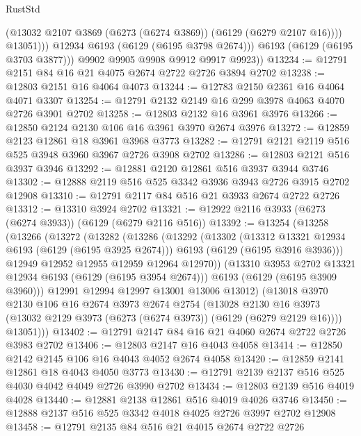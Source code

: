 \begin{lexlean}{RustStd}
\begin{coremodule}
                    (@13032 @2107 @3869 (@6273 (@6274 @3869)) (@6129 (@6279 @2107 @16))))
                  @13051)))
            @12934
            @6193
            (@6129 (@6195 @3798 @2674)))
          @6193
          (@6129 (@6195 @3703 @3877)))
        @9902
        @9905
        @9908
        @9912
        @9917
        @9923))
@13234 := @12791 @2151 @84 @16 @21 @4075 @2674 @2722 @2726 @3894 @2702
@13238 := @12803 @2151 @16 @4064 @4073
@13244 := @12783 @2150 @2361 @16 @4064 @4071 @3307
@13254 := @12791 @2132 @2149 @16 @299 @3978 @4063 @4070 @2726 @3901 @2702
@13258 := @12803 @2132 @16 @3961 @3976
@13266 := @12850 @2124 @2130 @106 @16 @3961 @3970 @2674 @3976
@13272 := @12859 @2123 @12861 @18 @3961 @3968 @3773
@13282 := @12791 @2121 @2119 @516 @525 @3948 @3960 @3967 @2726 @3908 @2702
@13286 := @12803 @2121 @516 @3937 @3946
@13292 := @12881 @2120 @12861 @516 @3937 @3944 @3746
@13302 := @12888 @2119 @516 @525 @3342 @3936 @3943 @2726 @3915 @2702 @12908
@13310 := @12791 @2117 @84 @516 @21 @3933 @2674 @2722 @2726
@13312 := @13310 @3924 @2702
@13321 := @12922 @2116 @3933 (@6273 (@6274 @3933)) (@6129 (@6279 @2116 @516))
@13392 := @13254
    (@13258
      (@13266
        (@13272
          (@13282
            (@13286
              (@13292
                (@13302
                  (@13312 @13321 @12934 @6193 (@6129 (@6195 @3925 @2674)))
                  @6193
                  (@6129 (@6195 @3916 @3936)))
                @12949
                @12952
                @12955
                @12959
                @12964
                @12970))
            (@13310 @3953 @2702 @13321 @12934 @6193 (@6129 (@6195 @3954 @2674)))
            @6193
            (@6129 (@6195 @3909 @3960)))
          @12991
          @12994
          @12997
          @13001
          @13006
          @13012)
        (@13018
          @3970
          @2130
          @106
          @16
          @2674
          @3973
          @2674
          @2754
          (@13028
            @2130
            @16
            @3973
            (@13032 @2129 @3973 (@6273 (@6274 @3973)) (@6129 (@6279 @2129 @16))))
          @13051)))
@13402 := @12791 @2147 @84 @16 @21 @4060 @2674 @2722 @2726 @3983 @2702
@13406 := @12803 @2147 @16 @4043 @4058
@13414 := @12850 @2142 @2145 @106 @16 @4043 @4052 @2674 @4058
@13420 := @12859 @2141 @12861 @18 @4043 @4050 @3773
@13430 := @12791 @2139 @2137 @516 @525 @4030 @4042 @4049 @2726 @3990 @2702
@13434 := @12803 @2139 @516 @4019 @4028
@13440 := @12881 @2138 @12861 @516 @4019 @4026 @3746
@13450 := @12888 @2137 @516 @525 @3342 @4018 @4025 @2726 @3997 @2702 @12908
@13458 := @12791 @2135 @84 @516 @21 @4015 @2674 @2722 @2726

\end{coremodule}
\end{lexlean}
